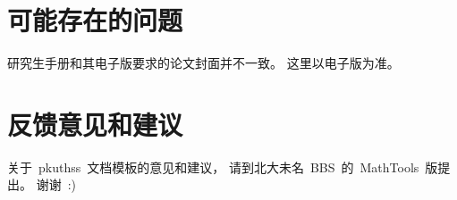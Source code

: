 	\section{可能存在的问题}

	研究生手册\supercite{F13}和其电子版要求的论文封面并不一致。
	这里以电子版为准。

	\section{反馈意见和建议}

	关于~pkuthss~文档模板的意见和建议，
	请到北大未名~BBS~的~MathTools~版提出。
	谢谢~:)

